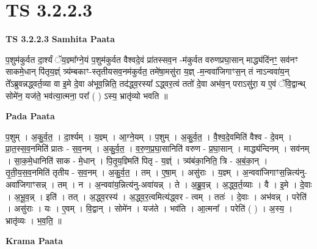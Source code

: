 \documentclass[17pt]{extarticle}
\begin{document}

\section{ TS 3.2.2.3 }

\textbf{TS 3.2.2.3 } \newline
\textbf{Samhita Paata} \newline

प॒शुम॑कुर्वत दा॒र्श्यं ॅय॒ज्ञ्मा᳚ग्ने॒यं प॒शुम॑कुर्वत वैश्वदे॒वं प्रा॑तस्सव॒न -म॑कुर्वत वरुणप्रघा॒सान् माद्ध्य॑दिंनꣳ॒॒ सव॑नꣳ साकमे॒धान् पि॑तृय॒ज्ञ्ं त्र्य॑म्बकाꣳ-स्तृतीयसव॒नम॑कुर्वत॒ तमे॑षा॒मसु॑रा य॒ज्ञ् -म॒न्ववा॑जिगाꣳस॒न् तं नाऽन्ववा॑य॒न् ते᳚ऽब्रुवन्नद्ध्वर्त॒व्या वा इ॒मे दे॒वा अ॑भूव॒न्निति॒ तद॑द्ध्व॒रस्या᳚ ऽद्ध्वर॒त्वं ततो॑ दे॒वा अभ॑व॒न् पराऽसु॑रा॒ य ए॒वं ॅवि॒द्वान्थ् सोमे॑न॒ यज॑ते॒ भव॑त्या॒त्मना॒ परा᳚ ( ) ऽस्य॒ भ्रातृ॑व्यो भवति ॥ \newline

\textbf{Pada Paata} \newline

प॒शुम् । अ॒कु॒र्व॒त॒ । दा॒र्श्यम् । य॒ज्ञ्म् । आ॒ग्ने॒यम् । प॒शुम् । अ॒कु॒र्व॒त॒ । वै॒श्व॒दे॒वमिति॑ वैश्व - दे॒वम् । प्रा॒त॒स्स॒व॒नमिति॑ प्रातः - स॒व॒नम् । अ॒कु॒र्व॒त॒ । व॒रु॒ण॒प्र॒घा॒सानिति॑ वरुण - प्र॒घा॒सान् । माद्ध्य॑न्दिनम् । सव॑नम् । सा॒क॒मे॒धानिति॑ साक - मे॒धान् । पि॒तृ॒य॒ज्ञ्मिति॑ पितृ - य॒ज्ञ्ं । त्र्य॑बंका॒निति॒ त्रि - अ॒बं॒का॒न् । तृ॒ती॒य॒स॒व॒नमिति॑ तृतीय - स॒व॒नम् । अ॒कु॒र्व॒त॒ । तम् । ए॒षा॒म् । असु॑राः । य॒ज्ञ्म् । अ॒न्ववा॑जिगाꣳस॒न्नित्य॑नु-अवा॑जिगाꣳसन्न् । तम् । न । अ॒न्ववा॑य॒न्नित्य॑नु-अवा॑यन्न् । ते । अ॒ब्रु॒व॒न्न् । अ॒द्ध्व॒र्त॒व्याः । वै । इ॒मे । दे॒वाः । अ॒भू॒व॒न्न् । इति॑ । तत् । अ॒द्ध्व॒रस्य॑ । अ॒द्ध्व॒र॒त्वमित्य॑द्ध्वर - त्वम् । ततः॑ । दे॒वाः । अभ॑वन्न् । परेति॑ । असु॑राः । यः । ए॒वम् । वि॒द्वान् । सोमे॑न । यज॑ते । भव॑ति । आ॒त्मना᳚ । परेति॑ ( ) । अ॒स्य॒ । भ्रातृ॑व्यः । भ॒व॒ति॒ ॥  \newline


\textbf{Krama Paata} \newline
\end{document}
